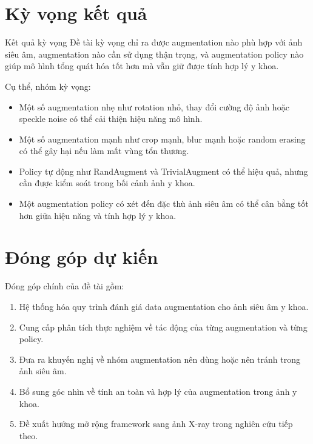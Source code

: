 \documentclass[12pt,a4paper]{article}
\begin{document}
\section{Kỳ vọng kết quả}

\begin{expectbox}{Kết quả kỳ vọng}
Đề tài kỳ vọng chỉ ra được augmentation nào phù hợp với ảnh siêu âm, augmentation nào cần sử dụng thận trọng, và augmentation policy nào giúp mô hình tổng quát hóa tốt hơn mà vẫn giữ được tính hợp lý y khoa.
\end{expectbox}

Cụ thể, nhóm kỳ vọng:

\begin{itemize}
    \item Một số augmentation nhẹ như rotation nhỏ, thay đổi cường độ ảnh hoặc speckle noise có thể cải thiện hiệu năng mô hình.
    \item Một số augmentation mạnh như crop mạnh, blur mạnh hoặc random erasing có thể gây hại nếu làm mất vùng tổn thương.
    \item Policy tự động như RandAugment và TrivialAugment có thể hiệu quả, nhưng cần được kiểm soát trong bối cảnh ảnh y khoa.
    \item Một augmentation policy có xét đến đặc thù ảnh siêu âm có thể cân bằng tốt hơn giữa hiệu năng và tính hợp lý y khoa.
\end{itemize}

\section{Đóng góp dự kiến}

Đóng góp chính của đề tài gồm:

\begin{enumerate}[label=\textbf{C\arabic*.}]
    \item Hệ thống hóa quy trình đánh giá data augmentation cho ảnh siêu âm y khoa.
    \item Cung cấp phân tích thực nghiệm về tác động của từng augmentation và từng policy.
    \item Đưa ra khuyến nghị về nhóm augmentation nên dùng hoặc nên tránh trong ảnh siêu âm.
    \item Bổ sung góc nhìn về tính an toàn và hợp lý của augmentation trong ảnh y khoa.
    \item Đề xuất hướng mở rộng framework sang ảnh X-ray trong nghiên cứu tiếp theo.
\end{enumerate}
\end{document}
